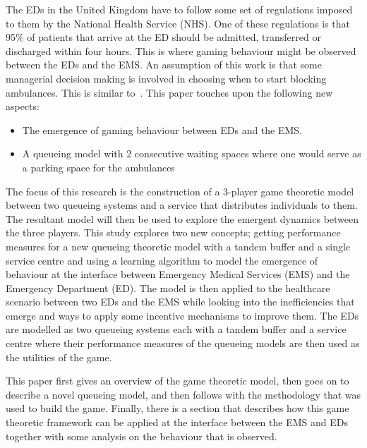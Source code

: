 The EDs in the United Kingdom have to follow some set of regulations imposed to 
them by the National Health Service (NHS).
One of these regulations is that 95\% of patients that arrive at the ED should 
be admitted, transferred or discharged within four hours.
This is where gaming behaviour might be observed between the EDs and the EMS.
An assumption of this work is that some managerial decision making is involved
in choosing when to start blocking ambulances.
This is similar to~\cite{deo2011centralized}.
This paper touches upon the following new aspects:
\begin{itemize}
    \item The emergence of gaming behaviour between EDs and the EMS.
    \item A queueing model with 2 consecutive waiting spaces where one would 
    serve as a parking space for the ambulances
\end{itemize}
The focus of this research is the construction of a 3-player game theoretic 
model between two queueing systems and a service that distributes individuals
to them. 
The resultant model will then be used to explore the emergent dynamics between 
the three players.
This study explores two new concepts; getting performance measures for a new
queueing theoretic model with a tandem buffer and a single service centre and 
using a learning algorithm to model the emergence of behaviour at the interface
between Emergency Medical Services (EMS) and the Emergency Department (ED).
The model is then applied to the healthcare scenario between two EDs and the 
EMS while looking into the inefficiencies that emerge and ways to apply some 
incentive mechanisms to improve them.
The EDs are modelled as two queueing systems each with a tandem buffer and a 
service centre where their performance measures of the queueing models are then
used as the utilities of the game.

This paper first gives an overview of the game theoretic model, then goes on 
to describe a novel queueing model, and then follows with the methodology that 
was used to build the game.
Finally, there is a section that describes how this game theoretic framework
can be applied at the interface between the EMS and EDs together with some 
analysis on the behaviour that is observed.
